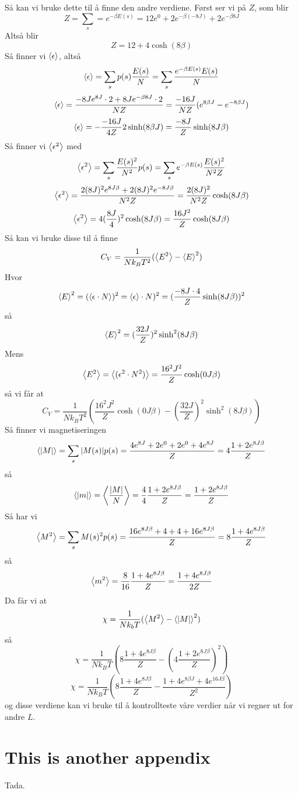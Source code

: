 \documentclass[reprint,english,notitlepage]{revtex4-2}  %
\begin{document}
Så kan vi bruke dette til å finne den andre verdiene. Først ser vi på $Z$, som blir 
$$
Z=\sum_s=e^{-\beta E(s)}=12 e^{0}+2e^{-\beta (-8J)}+2e^{-\beta 8J}$$
Altså blir $$Z=12+4\cosh(8\beta)
$$
Så finner vi $\expval{\epsilon}$, altså
$$
\expval{\epsilon}=\sum_{s}p(s)\frac{E(s)}{N}=\sum_{s}\frac{e^{-\beta E(s)}E(s)}{N}
$$
$$
\expval{\epsilon}=\frac{-8Je^{8J}\cdot 2 + 8Je^{-\beta 8J}\cdot 2}{NZ}=\frac{-16J}{NZ}(e^{8\beta J}-e^{-8\beta J})$$$$\expval{\epsilon}=-\frac{-16 J}{4Z}2\sinh(8\beta J)=\frac{-8J}{Z}\sinh(8J\beta)
$$
Så finner vi $\expval{\epsilon^2}$ med 
$$
\expval{\epsilon^2}=\sum_{s}\frac{E(s)^2}{N^2}p(s)=\sum_{s}e^{-\beta E(s)}\frac{E(s)^2}{N^2Z}
$$
$$
\expval{\epsilon^2}=\frac{2(8J)^2e^{8J\beta}+2(8J)^2e^{-8J\beta}}{N^2Z}=\frac{2(8J)^2}{N^2Z}\cosh(8J\beta)
$$
$$
\expval{\epsilon^2}=4(\frac{8J}{4})^2\cosh(8J\beta)=\frac{16J^2}{Z}\cosh(8J\beta)
$$
Så kan vi bruke disse til å finne
$$
C_V=\frac{1}{Nk_BT^2}(\expval{E^2}-\expval{E}^2)
$$
Hvor 
$$\expval{E}^2=(\expval{\epsilon\cdot N})^2=\expval{\epsilon}\cdot N)^2=(\frac{-8J\cdot 4}{Z}\sinh(8J\beta))^2$$så $$\expval{E}^2=(\frac{32J}{Z})^2\sinh^2(8J\beta)
$$
Mens
$$
\expval{E^2}=\expval{(\epsilon^2\cdot N^2)}=\frac{16^2J^2}{Z}\cosh(0J\beta)
$$
så vi får at
$$
C_V=\frac{1}{Nk_BT^2}(\frac{16^2J^2}{Z}\cosh(0J\beta)-(\frac{32J}{Z})^2\sinh^2(8J\beta))
$$
Så finner vi magnetiseringen
$$
\expval{|M|}=\sum_s |M(s)|p(s)=\frac{4e^{8J}+2e^0 +2e^0 +4e^{8J}}{Z}=4\frac{1+2e^{8J\beta}}{Z}
$$
så 
$$
\expval{|m|}=\expval{\frac{|M|}{N}}=\frac{4}{4}\frac{1+2e^{8J\beta}}{Z}=\frac{1+2e^{8J\beta}}{Z}
$$
Så har vi
$$
\expval{M^2}=\sum_s M(s)^2p(s)=\frac{16e^{8J\beta}+4+4+16e^{8J\beta}}{Z}=8\frac{1+4e^{8J\beta}}{Z}
$$
så
$$
\expval{m^2}=\frac{8}{16}\frac{1+4e^{8J\beta}}{Z}=\frac{1+4e^{8J\beta}}{2Z}
$$
Da får vi at
$$
\chi=\frac{1}{Nk_bT}(\expval{M^2}-\expval{|M|}^2)
$$
så 
$$
\chi=\frac{1}{Nk_BT}(8\frac{1+4e^{8J\beta}}{Z}-(4\frac{1+2e^{8J\beta}}{Z})^2)
$$
$$
\chi=\frac{1}{Nk_BT}(8\frac{1+4e^{8J\beta}}{Z}-\frac{1+4e^{8\beta J}+4e^{16J\beta}}{Z^2})
$$
og disse verdiene kan vi bruke til å kontrollteste våre verdier når vi regner ut for andre $L$.
\section{This is another appendix}\label{appendix}
Tada.
\end{document}

